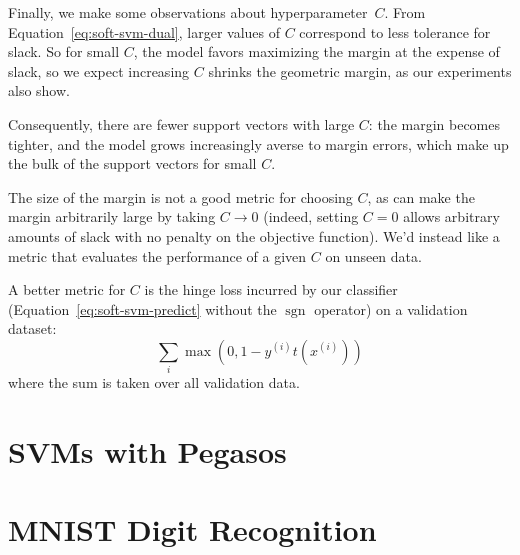 \documentclass{article}
\DeclareMathOperator{\sgn}{sgn}
\newcommand{\sind}[1]{^{(#1)}}
\begin{document}
\begin{multicols}{2}

Finally, we make some observations about hyperparameter~$C$.
From Equation~\ref{eq:soft-svm-dual},
larger values of $C$ correspond to less tolerance for slack.
So for small $C$,
the model favors
maximizing the margin at the expense of slack,
so we expect increasing $C$ shrinks the geometric margin,
as our experiments also show.

Consequently, there are fewer support vectors with large $C$:
the margin becomes tighter,
and the model grows increasingly averse to margin errors,
which make up the bulk of the support vectors for small $C$.

The size of the margin
is not a good metric for choosing $C$,
as can make the margin arbitrarily large
by taking $C \to 0$
(indeed, setting $C = 0$ allows arbitrary amounts of slack
with no penalty on the objective function).
We'd instead like a metric that evaluates
the performance of a given $C$
on unseen data.

A better metric for $C$ is
the hinge loss incurred by our classifier
(Equation~\ref{eq:soft-svm-predict} without the $\sgn$ operator)
on a validation dataset:
\begin{equation}
    \sum_{i} \max(0, 1 - y\sind{i} t(x\sind{i}))
\end{equation}
where the sum is taken over all validation data.



\section{SVMs with Pegasos}


\section{MNIST Digit Recognition}


\end{multicols}
\end{document}
